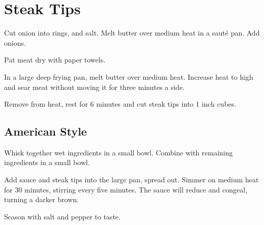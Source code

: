 

\section{Steak Tips}
\begin{recipe}



Cut onion into rings, and salt. Melt butter over medium heat in a sauté pan. Add onions.


Pat meat dry with paper towels.

In a large deep frying pan, melt butter over medium heat. Increase heat to high and sear meat without moving it for three minutes a side.

Remove from heat, rest for 6 minutes and cut steak tips into 1 inch cubes.

\subsection{American Style}


Whisk together wet ingredients in a small bowl. Combine with remaining ingredients in a small bowl.

Add sauce and steak tips into the large pan, spread out. Simmer on medium heat for 30 minutes, stirring every five minutes. The sauce will reduce and congeal, turning a darker brown.

Season with salt and pepper to taste.



\end{recipe}
